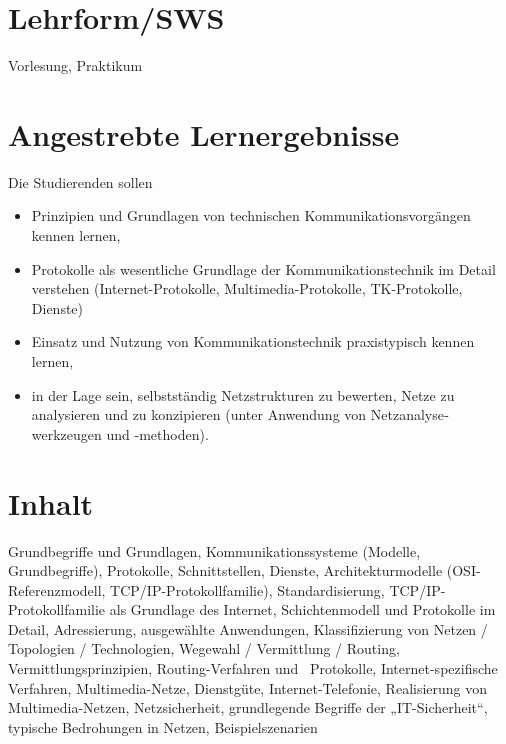 \hypertarget{lehrformswspathlabelmi-2017modulbeschreibungen-bachelorba_kommunikationstechnikundnetze}{%
\section*{Lehrform/SWS\label{/mi-2017/modulbeschreibungen-bachelor/BA_KommunikationstechnikundNetze}}\label{lehrformswspathlabelmi-2017modulbeschreibungen-bachelorba_kommunikationstechnikundnetze}}

Vorlesung, Praktikum

\hypertarget{angestrebte-lernergebnissepathlabelmi-2017modulbeschreibungen-bachelorba_kommunikationstechnikundnetze}{%
\section*{Angestrebte
Lernergebnisse\label{/mi-2017/modulbeschreibungen-bachelor/BA_KommunikationstechnikundNetze}}\label{angestrebte-lernergebnissepathlabelmi-2017modulbeschreibungen-bachelorba_kommunikationstechnikundnetze}}

Die Studierenden sollen

\begin{itemize}
\tightlist
\item
  Prinzipien und Grundlagen von technischen Kommunikations­vor­gängen
  kennen lernen,
\item
  Protokolle als wesentliche Grundlage der Kommunikationstechnik im
  Detail verstehen (Internet-Protokolle, Multimedia-Protokolle,
  TK-Protokolle, Dienste)
\item
  Einsatz und Nutzung von Kommunikations­tech­nik praxistypisch kennen
  lernen,
\item
  in der Lage sein, selbstständig Netzstrukturen zu bewerten, Netze zu
  analysieren und zu konzipieren (unter Anwendung von
  Netz­analyse­werkzeugen und -methoden).
\end{itemize}

\hypertarget{inhaltpathlabelmi-2017modulbeschreibungen-bachelorba_kommunikationstechnikundnetze}{%
\section*{Inhalt\label{/mi-2017/modulbeschreibungen-bachelor/BA_KommunikationstechnikundNetze}}\label{inhaltpathlabelmi-2017modulbeschreibungen-bachelorba_kommunikationstechnikundnetze}}

Grundbegriffe und Grundlagen, Kommunikationssysteme (Modelle,
Grundbegriffe), Protokolle, Schnittstellen, Dienste, Architekturmodelle
(OSI-Referenzmodell, TCP/IP-Protokollfamilie), Standardisierung,
TCP/IP-Protokollfamilie als Grundlage des Internet, Schichtenmodell und
Protokolle im Detail, Adressierung, ausgewählte Anwendungen,
Klassifizierung von Netzen / Topologien / Technologien, Wegewahl /
Vermittlung / Routing, Vermittlungsprinzipien, Routing-Verfahren und~
Protokolle, Internet-spezifische Verfahren, Multimedia-Netze,
Dienstgüte, Internet-Telefonie, Realisierung von Multimedia-Netzen,
Netzsicherheit, grundlegende Begriffe der „IT-Sicherheit``, typische
Bedrohungen in Netzen, Beispielszenarien

